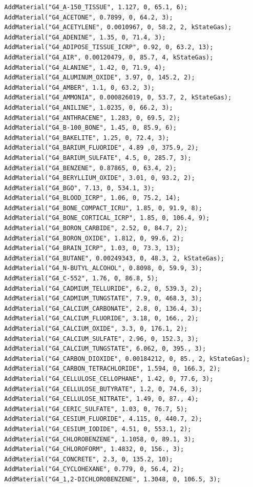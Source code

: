 \documentclass[a4paper,12pt]{article}
\begin{document}
\begin{verbatim}
  AddMaterial("G4_A-150_TISSUE", 1.127, 0, 65.1, 6);
  AddMaterial("G4_ACETONE", 0.7899, 0, 64.2, 3);
  AddMaterial("G4_ACETYLENE", 0.0010967, 0, 58.2, 2, kStateGas);
  AddMaterial("G4_ADENINE", 1.35, 0, 71.4, 3);
  AddMaterial("G4_ADIPOSE_TISSUE_ICRP", 0.92, 0, 63.2, 13);
  AddMaterial("G4_AIR", 0.00120479, 0, 85.7, 4, kStateGas);
  AddMaterial("G4_ALANINE", 1.42, 0, 71.9, 4);
  AddMaterial("G4_ALUMINUM_OXIDE", 3.97, 0, 145.2, 2);
  AddMaterial("G4_AMBER", 1.1, 0, 63.2, 3);
  AddMaterial("G4_AMMONIA", 0.000826019, 0, 53.7, 2, kStateGas);
  AddMaterial("G4_ANILINE", 1.0235, 0, 66.2, 3);
  AddMaterial("G4_ANTHRACENE", 1.283, 0, 69.5, 2);
  AddMaterial("G4_B-100_BONE", 1.45, 0, 85.9, 6);
  AddMaterial("G4_BAKELITE", 1.25, 0, 72.4, 3);
  AddMaterial("G4_BARIUM_FLUORIDE", 4.89 ,0, 375.9, 2);
  AddMaterial("G4_BARIUM_SULFATE", 4.5, 0, 285.7, 3);
  AddMaterial("G4_BENZENE", 0.87865, 0, 63.4, 2);
  AddMaterial("G4_BERYLLIUM_OXIDE", 3.01, 0, 93.2, 2);
  AddMaterial("G4_BGO", 7.13, 0, 534.1, 3);
  AddMaterial("G4_BLOOD_ICRP", 1.06, 0, 75.2, 14);
  AddMaterial("G4_BONE_COMPACT_ICRU", 1.85, 0, 91.9, 8);
  AddMaterial("G4_BONE_CORTICAL_ICRP", 1.85, 0, 106.4, 9);
  AddMaterial("G4_BORON_CARBIDE", 2.52, 0, 84.7, 2);
  AddMaterial("G4_BORON_OXIDE", 1.812, 0, 99.6, 2);
  AddMaterial("G4_BRAIN_ICRP", 1.03, 0, 73.3, 13);
  AddMaterial("G4_BUTANE", 0.00249343, 0, 48.3, 2, kStateGas);
  AddMaterial("G4_N-BUTYL_ALCOHOL", 0.8098, 0, 59.9, 3);
  AddMaterial("G4_C-552", 1.76, 0, 86.8, 5);
  AddMaterial("G4_CADMIUM_TELLURIDE", 6.2, 0, 539.3, 2);
  AddMaterial("G4_CADMIUM_TUNGSTATE", 7.9, 0, 468.3, 3);
  AddMaterial("G4_CALCIUM_CARBONATE", 2.8, 0, 136.4, 3);
  AddMaterial("G4_CALCIUM_FLUORIDE", 3.18, 0, 166., 2);
  AddMaterial("G4_CALCIUM_OXIDE", 3.3, 0, 176.1, 2);
  AddMaterial("G4_CALCIUM_SULFATE", 2.96, 0, 152.3, 3);
  AddMaterial("G4_CALCIUM_TUNGSTATE", 6.062, 0, 395., 3);
  AddMaterial("G4_CARBON_DIOXIDE", 0.00184212, 0, 85., 2, kStateGas);
  AddMaterial("G4_CARBON_TETRACHLORIDE", 1.594, 0, 166.3, 2);
  AddMaterial("G4_CELLULOSE_CELLOPHANE", 1.42, 0, 77.6, 3);
  AddMaterial("G4_CELLULOSE_BUTYRATE", 1.2, 0, 74.6, 3);
  AddMaterial("G4_CELLULOSE_NITRATE", 1.49, 0, 87., 4);
  AddMaterial("G4_CERIC_SULFATE", 1.03, 0, 76.7, 5);
  AddMaterial("G4_CESIUM_FLUORIDE", 4.115, 0, 440.7, 2);
  AddMaterial("G4_CESIUM_IODIDE", 4.51, 0, 553.1, 2);
  AddMaterial("G4_CHLOROBENZENE", 1.1058, 0, 89.1, 3);
  AddMaterial("G4_CHLOROFORM", 1.4832, 0, 156., 3);
  AddMaterial("G4_CONCRETE", 2.3, 0, 135.2, 10);
  AddMaterial("G4_CYCLOHEXANE", 0.779, 0, 56.4, 2);
  AddMaterial("G4_1,2-DICHLOROBENZENE", 1.3048, 0, 106.5, 3);

\end{verbatim}
\end{document}
